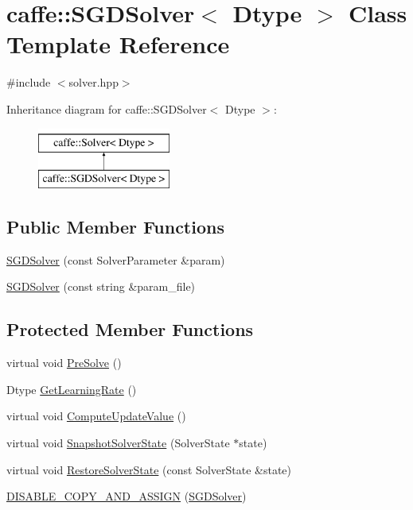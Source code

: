 \hypertarget{classcaffe_1_1_s_g_d_solver}{\section{caffe\+:\+:S\+G\+D\+Solver$<$ Dtype $>$ Class Template Reference}
\label{classcaffe_1_1_s_g_d_solver}
}


{\ttfamily \#include $<$solver.\+hpp$>$}

Inheritance diagram for caffe\+:\+:S\+G\+D\+Solver$<$ Dtype $>$\+:\begin{figure}[H]
\begin{center}
\leavevmode
\includegraphics[height=2.000000cm]{classcaffe_1_1_s_g_d_solver}
\end{center}
\end{figure}
\subsection*{Public Member Functions}
\begin{DoxyCompactItemize}
\item 
\hyperlink{classcaffe_1_1_s_g_d_solver_a144735c352c1eff4e3bb3f8f03c81d4b}{S\+G\+D\+Solver} (const Solver\+Parameter \&param)
\item 
\hyperlink{classcaffe_1_1_s_g_d_solver_ac1b30549a2cddbbb1312b7fa10aca1c6}{S\+G\+D\+Solver} (const string \&param\+\_\+file)
\end{DoxyCompactItemize}
\subsection*{Protected Member Functions}
\begin{DoxyCompactItemize}
\item 
virtual void \hyperlink{classcaffe_1_1_s_g_d_solver_a6488286ff665df1907d64a92d4acf835}{Pre\+Solve} ()
\item 
Dtype \hyperlink{classcaffe_1_1_s_g_d_solver_a985436c42815498163a3d74fdb64ee70}{Get\+Learning\+Rate} ()
\item 
virtual void \hyperlink{classcaffe_1_1_s_g_d_solver_a15d1fb9c2fdcc59ab8ef1b69aae0f6ea}{Compute\+Update\+Value} ()
\item 
virtual void \hyperlink{classcaffe_1_1_s_g_d_solver_a986923b613b026ea23df4d348cb9e802}{Snapshot\+Solver\+State} (Solver\+State $\ast$state)
\item 
virtual void \hyperlink{classcaffe_1_1_s_g_d_solver_aeda94078ad9653b9a63d59ea86bef04c}{Restore\+Solver\+State} (const Solver\+State \&state)
\item 
\hyperlink{classcaffe_1_1_s_g_d_solver_a4b37f2267ebd84e62ee486470b2b0c2b}{D\+I\+S\+A\+B\+L\+E\+\_\+\+C\+O\+P\+Y\+\_\+\+A\+N\+D\+\_\+\+A\+S\+S\+I\+G\+N} (\hyperlink{classcaffe_1_1_s_g_d_solver}{S\+G\+D\+Solver})
\end{DoxyCompactItemize}
